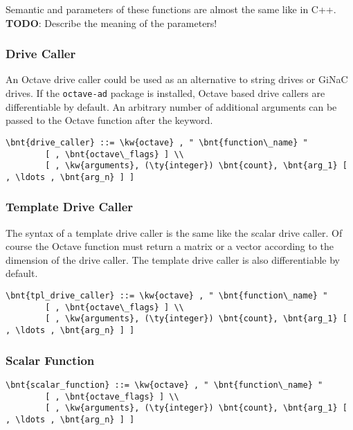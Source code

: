 Semantic and parameters of these functions are almost the same like in C++. \\
\textbf{TODO}: Describe the meaning of the parameters!

\subsubsection{Drive Caller}
An Octave drive caller could be used as an alternative to string drives or GiNaC drives. 
If the \texttt{octave-ad} package is installed, Octave based drive callers are differentiable by default.
An arbitrary number of additional arguments can be passed to the Octave function  after the  keyword.
\begin{Verbatim}[commandchars=\\\{\}]
    \bnt{drive_caller} ::= \kw{octave} , " \bnt{function\_name} "
        [ , \bnt{octave\_flags} ] \\
        [ , \kw{arguments}, (\ty{integer}) \bnt{count}, \bnt{arg_1} [ , \ldots , \bnt{arg_n} ] ]
\end{Verbatim}

\subsubsection{Template Drive Caller}
The syntax of a template drive caller is the same like the scalar drive caller. Of course the Octave function must return a matrix or a vector according to the dimension of the drive caller. The template drive caller is also differentiable by default.
\begin{Verbatim}[commandchars=\\\{\}]
    \bnt{tpl_drive_caller} ::= \kw{octave} , " \bnt{function\_name} "
        [ , \bnt{octave\_flags} ] \\
        [ , \kw{arguments}, (\ty{integer}) \bnt{count}, \bnt{arg_1} [ , \ldots , \bnt{arg_n} ] ]
\end{Verbatim}

\subsubsection{Scalar Function}
\begin{Verbatim}[commandchars=\\\{\}]
    \bnt{scalar_function} ::= \kw{octave} , " \bnt{function\_name} "
        [ , \bnt{octave_flags} ] \\
        [ , \kw{arguments}, (\ty{integer}) \bnt{count}, \bnt{arg_1} [ , \ldots , \bnt{arg_n} ] ]
\end{Verbatim}

